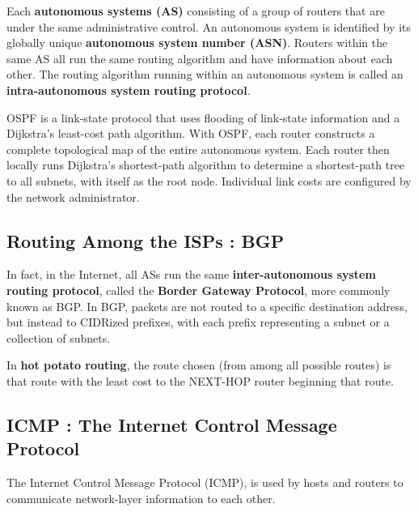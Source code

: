 \documentclass[11pt]{article}
\begin{document}
Each \textbf{autonomous systems (AS)} consisting of a group of routers that are under the same administrative control. An autonomous system is identified by its globally unique \textbf{autonomous system number (ASN)}. Routers within the same AS all run the same routing algorithm and have information about each other. The routing algorithm running within an autonomous system is called an \textbf{intra-autonomous system routing protocol}.

OSPF is a link-state protocol that uses flooding of link-state information and a Dijkstra’s least-cost path algorithm. With OSPF, each router constructs a complete topological map of the entire autonomous system. Each router then locally runs Dijkstra’s shortest-path algorithm to determine a shortest-path tree to all subnets, with itself as the root node. Individual link costs are configured by the network administrator.

\subsection{Routing Among the ISPs : BGP}

In fact, in the Internet, all ASs run the same \textbf{inter-autonomous system routing protocol}, called the \textbf{Border Gateway Protocol}, more commonly known as BGP. In BGP, packets are not routed to a specific destination address, but instead to CIDRized prefixes, with each prefix representing a subnet or a collection of subnets.

In \textbf{hot potato routing}, the route chosen (from among all possible routes) is that route with the least cost to the NEXT-HOP router beginning that route. 

\subsection{ICMP : The Internet Control Message Protocol}

The Internet Control Message Protocol (ICMP), is used by hosts and routers to communicate network-layer information to each other. 
\end{document}
